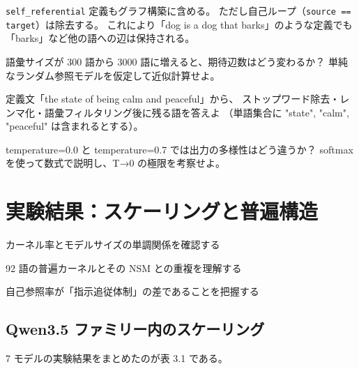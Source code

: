 \documentclass[lang=jp, color=black, mode=simple, 11pt]{elegantbook}
\begin{document}
\begin{note}
  \texttt{self\_referential} 定義もグラフ構築に含める。
  ただし自己ループ（\texttt{source == target}）は除去する。
  これにより「dog is a dog that barks」のような定義でも
  「barks」など他の語への辺は保持される。
\end{note}

\begin{problemset}[第 2 章の確認問題]
  \item 語彙サイズが 300 語から 3000 語に増えると、期待辺数はどう変わるか？
        単純なランダム参照モデルを仮定して近似計算せよ。
  \item 定義文「the state of being calm and peaceful」から、
        ストップワード除去・レンマ化・語彙フィルタリング後に残る語を答えよ
        （単語集合に "state", "calm", "peaceful" は含まれるとする）。
  \item temperature=0.0 と temperature=0.7 では出力の多様性はどう違うか？
        softmax を使って数式で説明し、T→0 の極限を考察せよ。
\end{problemset}

\chapter{実験結果：スケーリングと普遍構造}

\begin{introduction}[この章で学ぶこと]
  \item カーネル率とモデルサイズの単調関係を確認する
  \item 92 語の普遍カーネルとその NSM との重複を理解する
  \item 自己参照率が「指示追従体制」の差であることを把握する
\end{introduction}

\section{Qwen3.5 ファミリー内のスケーリング}

7 モデルの実験結果をまとめたのが表 3.1 である。
\end{document}
